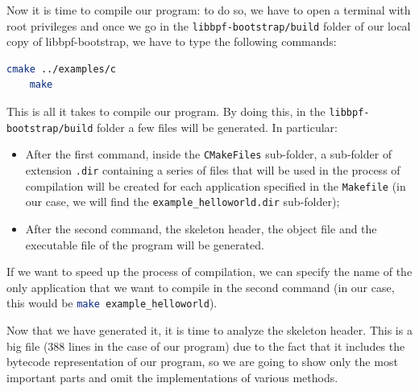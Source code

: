 Now it is time to compile our program: to do so, we have to open a terminal with root privileges and once we go in the \colorbox{backcolour}{\lstinline[style=highlight, language=bash]|libbpf-bootstrap/build|} folder of our local copy of libbpf-bootstrap, we have to type the following commands:

\begin{lstlisting}[style=commandline, language=bash, caption={libbpf-bootstrap programs compilation commands}]
	cmake ../examples/c
	make
\end{lstlisting}

This is all it takes to compile our program.
By doing this, in the \colorbox{backcolour}{\lstinline[style=highlight, language=bash]|libbpf-bootstrap/build|} folder a few files will be generated.
In particular:

\begin{itemize}
	\item 
		After the first command, inside the \colorbox{backcolour}{\lstinline[style=highlight, language=bash]|CMakeFiles|} sub-folder, a sub-folder of extension \colorbox{backcolour}{\lstinline[style=highlight, language=bash]|.dir|} containing a series of files that will be used in the process of compilation will be created for each application specified in the \colorbox{backcolour}{\lstinline[style=highlight, language=bash]|Makefile|} (in our case, we will find the \colorbox{backcolour}{\lstinline[style=highlight, language=bash]|example_helloworld.dir|} sub-folder);
	\item 
		After the second command, the skeleton header, the object file and the executable file of the program will be generated.
\end{itemize}

If we want to speed up the process of compilation, we can specify the name of the only application that we want to compile in the second command (in our case, this would be \colorbox{backcolour}{\lstinline[style=highlight, language=bash]|make example_helloworld|}).

Now that we have generated it, it is time to analyze the skeleton header.
This is a big file (388 lines in the case of our program) due to the fact that it includes the bytecode representation of our program, so we are going to show only the most important parts and omit the implementations of various methods.

